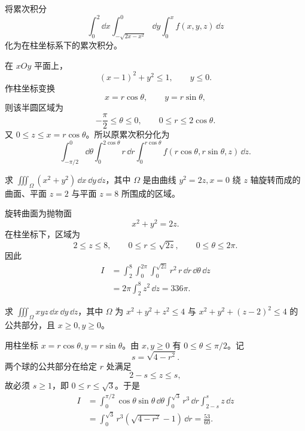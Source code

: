 \begin{xexercise}[2]
将累次积分
  \[
    \int_0^2\dd x\int_{-\sqrt{2x-x^2}}^0\dd y\int_0^x f(x,y,z)\,\dd z
  \]
  化为在柱坐标系下的累次积分。
\end{xexercise}
\begin{xsolution}
在 $xOy$ 平面上，
\[
 (x-1)^2+y^2\le1,
 \qquad y\le0.
\]
作柱坐标变换
\[
 x=r\cos\theta,
 \qquad y=r\sin\theta,
\]
则该半圆区域为
\[
 -\frac\pi2\le\theta\le0,
 \qquad0\le r\le2\cos\theta.
\]
又 $0\le z\le x=r\cos\theta$。所以原累次积分化为
\[
 \boxed{
 \int_{-\pi/2}^{0}\dd\theta
 \int_0^{2\cos\theta}r\,\dd r
 \int_0^{r\cos\theta}
 f(r\cos\theta,r\sin\theta,z)\,\dd z }.
\]
\end{xsolution}


\begin{xexercise}[3]
求 $\displaystyle\iiint_\Omega(x^2+y^2)\,\dd x\,\dd y\,\dd z$，其中 $\Omega$ 是由曲线 $y^2=2z,x=0$ 绕 $z$ 轴旋转而成的曲面、平面 $z=2$ 与平面 $z=8$ 所围成的区域。
\end{xexercise}
\begin{xsolution}
旋转曲面为抛物面
\[
 x^2+y^2=2z.
\]
在柱坐标下，区域为
\[
 2\le z\le8,
 \qquad0\le r\le\sqrt{2z},
 \qquad0\le\theta\le2\pi.
\]
因此
\begin{align*}
 I&=\int_2^8\int_0^{2\pi}\int_0^{\sqrt{2z}}r^2\,r\,\dd r\,\dd\theta\,\dd z\\
 &=2\pi\int_2^8 z^2\,\dd z
 =\boxed{336\pi}.
\end{align*}
\end{xsolution}


\begin{xexercise}[4]
求 $\displaystyle\iiint_\Omega xyz\,\dd x\,\dd y\,\dd z$，其中 $\Omega$ 为 $x^2+y^2+z^2\le4$ 与 $x^2+y^2+(z-2)^2\le4$ 的公共部分，且 $x\ge0,y\ge0$。
\end{xexercise}
\begin{xsolution}
用柱坐标 $x=r\cos\theta,y=r\sin\theta$。由 $x,y\ge0$ 有 $0\le\theta\le\pi/2$。记
\[
 s=\sqrt{4-r^2}.
\]
两个球的公共部分在给定 $r$ 处满足
\[
 2-s\le z\le s,
\]
故必须 $s\ge1$，即 $0\le r\le\sqrt3$。于是
\begin{align*}
 I&=\int_0^{\pi/2}\cos\theta\sin\theta\,\dd\theta
 \int_0^{\sqrt3}r^3\,\dd r\int_{2-s}^{s}z\,\dd z\\
 &=\int_0^{\sqrt3}r^3(\sqrt{4-r^2}-1)\,\dd r
 =\boxed{\frac{53}{60}}.
\end{align*}
\end{xsolution}


